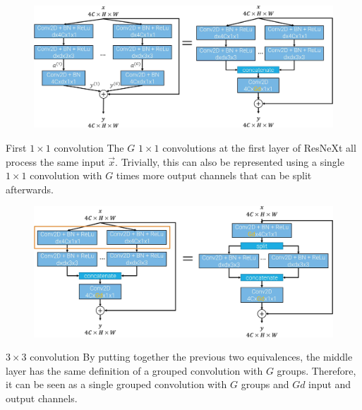 \begin{description}
\begin{description}
\begin{descriptionlist}
                        \begin{figure}[H]
                            \centering
                            \includegraphics[width=0.8\linewidth]{./img/_resnext_to_resnet_l3.jpg}
                        \end{figure}

                    \item[First $1 \times 1$ convolution] 
                        The $G$ $1 \times 1$ convolutions at the first layer of ResNeXt all process the same input $\vec{x}$. Trivially, this can also be represented using a single $1 \times 1$ convolution with $G$ times more output channels that can be split afterwards.

                        \begin{figure}[H]
                            \centering
                            \includegraphics[width=0.8\linewidth]{./img/_resnext_to_resnet_l1.jpg}
                        \end{figure}

                    \item[$3 \times 3$ convolution] 
                        By putting together the previous two equivalences, the middle layer has the same definition of a grouped convolution with $G$ groups. Therefore, it can be seen as a single grouped convolution with $G$ groups and $Gd$ input and output channels.


\end{descriptionlist}
\end{description}
\end{description}
